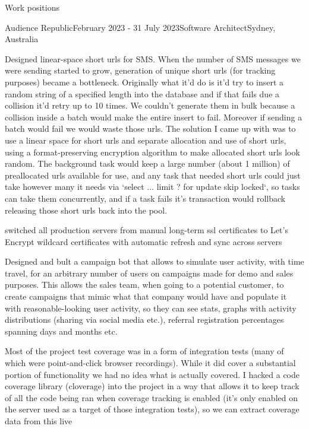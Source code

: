 \documentclass{resume} %
\begin{document}
\begin{rSection}{Work positions}
\begin{rSubsection}{Audience Republic}{February 2023 - 31 July 2023}{Software Architect}{Sydney, Australia} %
\item Designed linear-space short urls for SMS. When the number of SMS messages we were sending started to grow, generation of
    unique short urls (for tracking purposes) became a bottleneck. Originally what it'd do is it'd try to insert a random string
    of a specified length into the database and if that fails due a collision it'd retry up to 10 times. We couldn't generate
    them in bulk because a collision inside a batch would make the entire insert to fail. Moreover if sending a batch would fail
    we would waste those urls. The solution I came up with was to use a linear space for short urls and separate allocation and
    use of short urls, using a format-preserving encryption algorithm to make allocated short urls look random. The background task
    would keep a large number (about 1 million) of preallocated urls available for use, and any task that needed short urls could
    just take however many it needs via `select ... limit ? for update skip locked`, so tasks can take them concurrently, and if
    a task fails it's transaction would rollback releasing those short urls back into the pool.
\item switched all production servers from manual long-term ssl certificates to Let's Encrypt wildcard certificates with automatic
    refresh and sync across servers 
\item Designed and bult a campaign bot that allows to simulate user activity, with time travel, for an arbitrary number of users on
    campaigns made for demo and sales purposes. This allows the sales team, when going to a potential customer, to create campaigns
    that mimic what that company would have and populate it with reasonable-looking user activity, so they can see stats, graphs with
    activity distributions (sharing via social media etc.), referral registration percentages spanning days and months etc.
\item Most of the project test coverage was in a form of integration tests (many of which were point-and-click browser recordings).
    While it did cover a substantial portion of functionality we had no idea what is actually covered. I hacked a code coverage library
    (cloverage) into the project in a way that allows it to keep track of all the code being ran when coverage tracking is enabled
    (it's only enabled on the server used as a target of those integration tests), so we can extract coverage data from this live

\end{rSubsection}
\end{rSection}
\end{document}
